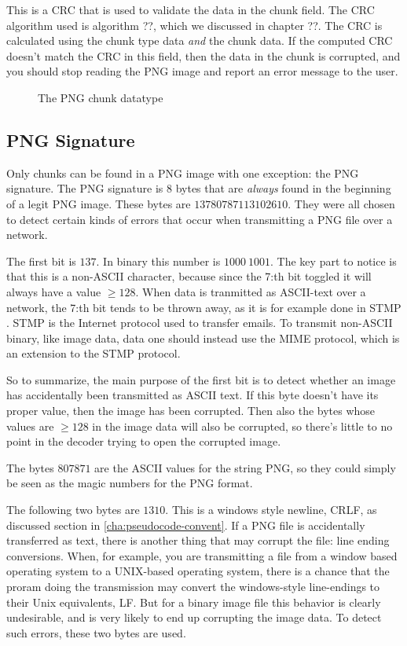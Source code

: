 This is a CRC that is used to validate the data in the chunk
field. The CRC algorithm used is algorithm ??, which we discussed in
chapter ??. The CRC is calculated using the chunk type data
\textit{and} the chunk data. If the computed CRC doesn't match the CRC
in this field, then the data in the chunk is corrupted, and you should
stop reading the PNG image and report an error message to the user.


\begin{figure}
  \centering
  \caption{The PNG chunk datatype}
  \label{fig:png-chunk}
\end{figure}

\subsection{PNG Signature}

Only chunks can be found in a PNG image with one exception: the PNG
signature. The PNG signature is 8 bytes that are \textit{always} found
in the beginning of a legit PNG image. These bytes are $137 80 78 71
13 10 26 10$. They were all chosen to detect certain kinds of errors
that occur when transmitting a PNG file over a network.

The first bit is $137$. In binary this number is $1000\ 1001$. The key
part to notice is that this is a non-ASCII character, because since
the 7:th bit toggled it will always have a value $\ge 128$. When data
is tranmitted as ASCII-text over a network, the 7:th bit tends to be
thrown away, as it is for example done in STMP \cite{rfc5321}. STMP is
the Internet protocol used to transfer emails. To transmit non-ASCII
binary, like image data, data one should instead use the MIME
protocol, which is an extension to the STMP protocol.

So to summarize, the main purpose of the first bit is to detect
whether an image has accidentally been transmitted as ASCII text. If
this byte doesn't have its proper value, then the image has been
corrupted. Then also the bytes whose values are $\ge 128$ in the image
data will also be corrupted, so there's little to no point in the
decoder trying to open the corrupted image.

The bytes $80 78 71$ are the ASCII values for the string PNG, so they
could simply be seen as the magic numbers for the PNG format.

The following two bytes are $13 10$. This is a windows style newline,
CRLF, as discussed section in \ref{cha:pseudocode-convent}. If a PNG
file is accidentally transferred as text, there is another thing that
may corrupt the file: line ending conversions. When, for example, you
are transmitting a file from a window based operating system to a
UNIX-based operating system, there is a chance that the proram doing
the transmission may convert the windows-style line-endings to their
Unix equivalents, LF. But for a binary image file this behavior is
clearly undesirable, and is very likely to end up corrupting the image
data. To detect such errors, these two bytes are used.

